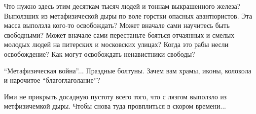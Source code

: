 Что нужно здесь этим десяткам тысяч людей и тоннам выкрашенного железа?
Выползших из метафизической дыры по воле горстки опасных авантюристов. Эта
масса выползла кого-то освобождать? Может вначале сами научитесь быть
свободными? Может вначале сами перестаньте бояться отчаянных и смелых молодых
людей на питерских и московских улицах? Когда это рабы несли освобождение? Как
могут освобождать ненавистники свободы?

\enquote{Метафизическая война}... Праздные болтуны. Зачем вам храмы, иконы, колокола и
нарочитое \enquote{благоглаголание}?

Ими не прикрыть досадную пустоту всего того, что с лязгом выползло из
метфизичемкой дыры. Чтобы снова туда провплиться в скором времени...

